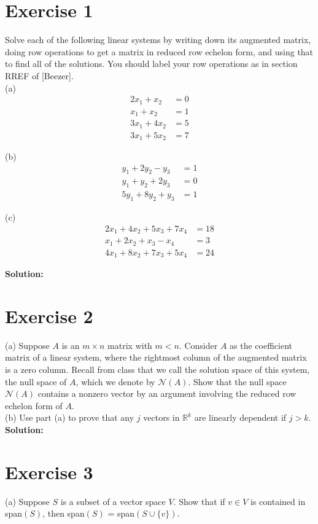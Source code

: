 \documentclass{article}
\begin{document}
\section*{Exercise 1}
Solve each of the following linear systems by writing down its augmented matrix, doing row operations to get a matrix in reduced row echelon form, and using that to find all of the solutions. You should label your row operations as in section RREF of [Beezer]. \\

(a) 
\begin{align*}
2x_1 + x_2 &= 0 \\
x_1 + x_2 &= 1 \\
3x_1 + 4x_2 &= 5 \\
3x_1 + 5x_2 &= 7
\end{align*}

(b)
\begin{align*}
y_1 + 2y_2 - y_3 &= 1 \\
y_1 + y_2 + 2y_3 &= 0 \\
5y_1 + 8y_2 + y_3 &= 1
\end{align*}

(c)
\begin{align*}
2x_1 + 4x_2 + 5x_3 + 7x_4 &= 18 \\
x_1 + 2x_2 + x_3 - x_4 &= 3 \\
4x_1 + 8x_2 + 7x_3 + 5x_4 &= 24
\end{align*}

\textbf{Solution:}
\newpage

\section*{Exercise 2}
(a) Suppose $A$ is an $m \times n$ matrix with $m < n$. Consider $A$ as the coefficient matrix of a linear system, where the rightmost column of the augmented matrix is a zero column. Recall from class that we call the solution space of this system, the null space of $A$, which we denote by $\mathcal{N}(A)$. Show that the null space $\mathcal{N}(A)$ contains a nonzero vector by an argument involving the reduced row echelon form of $A$. \\

\noindent
(b) Use part (a) to prove that any $j$ vectors in $\mathbb{R}^k$ are linearly dependent if $j > k$. \\

\textbf{Solution:}
\newpage

\section*{Exercise 3}
(a) Suppose $S$ is a subset of a vector space $V$. Show that if $v \in V$ is contained in span$(S)$, then span$(S)$ = span$(S \cup \{v\})$. \\
\end{document}
